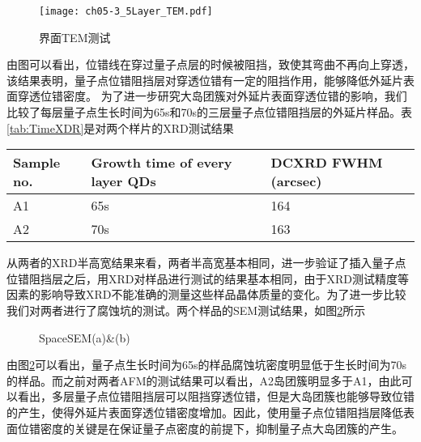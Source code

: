 \begin{figure}[ht]
	\centering
	\texttt{[image: ch05-3\_5Layer\_TEM.pdf]}
	\caption{界面TEM测试}
	\label{fig:5LayerTEM}
\end{figure}

由图可以看出，位错线在穿过量子点层的时候被阻挡，致使其弯曲不再向上穿透，该结果表明，量子点位错阻挡层对穿透位错有一定的阻挡作用，能够降低外延片表面穿透位错密度。
为了进一步研究大岛团簇对外延片表面穿透位错的影响，我们比较了每层量子点生长时间为65s和70s的三层量子点位错阻挡层的外延片样品。表\ref{tab:TimeXDR}是对两个样片的XRD测试结果

\begin{table*}[htbp] 
	\centering
	\caption{\label{tab:TimeXDR}不同生长时间XDR测试结果}  
	\begin{tabular}{m{}<{\centering}m{}<{\centering}m{}<{\centering}}  
		\toprule
			Sample no. & Growth time of every layer QDs & DCXRD FWHM (arcsec) \\
		\midrule 
			A1 & 65s & 164 \\
			A2 & 70s & 163 \\
		\bottomrule
	\end{tabular}
\end{table*}

从两者的XRD半高宽结果来看，两者半高宽基本相同，进一步验证了插入量子点位错阻挡层之后，用XRD对样品进行测试的结果基本相同，由于XRD测试精度等因素的影响导致XRD不能准确的测量这些样品晶体质量的变化。为了进一步比较我们对两者进行了腐蚀坑的测试。两个样品的SEM测试结果，如图\ref{fig:SpaceSEM}所示

\begin{figure}[ht]
	\centering
	\caption{SpaceSEM(a)\&(b)}
	\label{fig:SpaceSEM}
\end{figure}

由图\ref{fig:SpaceSEM}可以看出，量子点生长时间为65s的样品腐蚀坑密度明显低于生长时间为70s的样品。而之前对两者AFM的测试结果可以看出，A2岛团簇明显多于A1，由此可以看出，多层量子点位错阻挡层可以阻挡穿透位错，但是大岛团簇也能够导致位错的产生，使得外延片表面穿透位错密度增加。因此，使用量子点位错阻挡层降低表面位错密度的关键是在保证量子点密度的前提下，抑制量子点大岛团簇的产生。


\ifx\usechapbib\empty


\fi

